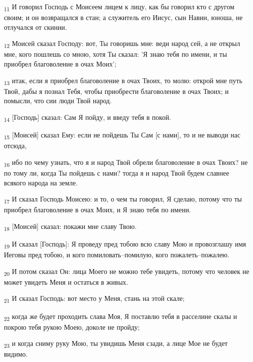 \begin{tcolorbox}
\textsubscript{11} И говорил Господь с Моисеем лицем к лицу, как бы говорил кто с другом своим; и он возвращался в стан; а служитель его Иисус, сын Навин, юноша, не отлучался от скинии.
\end{tcolorbox}
\begin{tcolorbox}
\textsubscript{12} Моисей сказал Господу: вот, Ты говоришь мне: веди народ сей, а не открыл мне, кого пошлешь со мною, хотя Ты сказал: 'Я знаю тебя по имени, и ты приобрел благоволение в очах Моих';
\end{tcolorbox}
\begin{tcolorbox}
\textsubscript{13} итак, если я приобрел благоволение в очах Твоих, то молю: открой мне путь Твой, дабы я познал Тебя, чтобы приобрести благоволение в очах Твоих; и помысли, что сии люди Твой народ.
\end{tcolorbox}
\begin{tcolorbox}
\textsubscript{14} [Господь] сказал: Сам Я пойду, и введу тебя в покой.
\end{tcolorbox}
\begin{tcolorbox}
\textsubscript{15} [Моисей] сказал Ему: если не пойдешь Ты Сам [с нами], то и не выводи нас отсюда,
\end{tcolorbox}
\begin{tcolorbox}
\textsubscript{16} ибо по чему узнать, что я и народ Твой обрели благоволение в очах Твоих? не по тому ли, когда Ты пойдешь с нами? тогда я и народ Твой будем славнее всякого народа на земле.
\end{tcolorbox}
\begin{tcolorbox}
\textsubscript{17} И сказал Господь Моисею: и то, о чем ты говорил, Я сделаю, потому что ты приобрел благоволение в очах Моих, и Я знаю тебя по имени.
\end{tcolorbox}
\begin{tcolorbox}
\textsubscript{18} [Моисей] сказал: покажи мне славу Твою.
\end{tcolorbox}
\begin{tcolorbox}
\textsubscript{19} И сказал [Господь]: Я проведу пред тобою всю славу Мою и провозглашу имя Иеговы пред тобою, и кого помиловать--помилую, кого пожалеть--пожалею.
\end{tcolorbox}
\begin{tcolorbox}
\textsubscript{20} И потом сказал Он: лица Моего не можно тебе увидеть, потому что человек не может увидеть Меня и остаться в живых.
\end{tcolorbox}
\begin{tcolorbox}
\textsubscript{21} И сказал Господь: вот место у Меня, стань на этой скале;
\end{tcolorbox}
\begin{tcolorbox}
\textsubscript{22} когда же будет проходить слава Моя, Я поставлю тебя в расселине скалы и покрою тебя рукою Моею, доколе не пройду;
\end{tcolorbox}
\begin{tcolorbox}
\textsubscript{23} и когда сниму руку Мою, ты увидишь Меня сзади, а лице Мое не будет видимо.
\end{tcolorbox}
